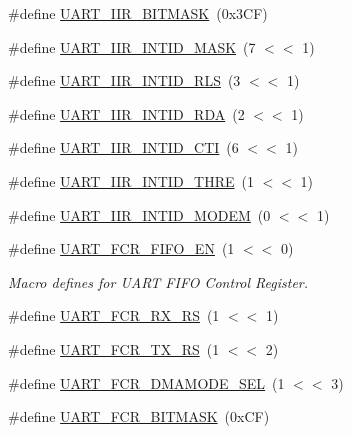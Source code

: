\begin{DoxyCompactItemize}
\item 
\#define \hyperlink{group___u_a_r_t__18_x_x__43_x_x_gad443b74131fa7b7aecf0f1c581172faa}{U\+A\+R\+T\+\_\+\+I\+I\+R\+\_\+\+B\+I\+T\+M\+A\+SK}~(0x3\+C\+F)
\item 
\#define \hyperlink{group___u_a_r_t__18_x_x__43_x_x_ga6f78952aec5835ac753718323b681910}{U\+A\+R\+T\+\_\+\+I\+I\+R\+\_\+\+I\+N\+T\+I\+D\+\_\+\+M\+A\+SK}~(7 $<$$<$ 1)
\item 
\#define \hyperlink{group___u_a_r_t__18_x_x__43_x_x_ga4441660d2a99f6b17a79eafbfb0424dd}{U\+A\+R\+T\+\_\+\+I\+I\+R\+\_\+\+I\+N\+T\+I\+D\+\_\+\+R\+LS}~(3 $<$$<$ 1)
\item 
\#define \hyperlink{group___u_a_r_t__18_x_x__43_x_x_gac646d8f797f3e71e01f4361997fc581b}{U\+A\+R\+T\+\_\+\+I\+I\+R\+\_\+\+I\+N\+T\+I\+D\+\_\+\+R\+DA}~(2 $<$$<$ 1)
\item 
\#define \hyperlink{group___u_a_r_t__18_x_x__43_x_x_ga965ba229214955385f11277549b7ecce}{U\+A\+R\+T\+\_\+\+I\+I\+R\+\_\+\+I\+N\+T\+I\+D\+\_\+\+C\+TI}~(6 $<$$<$ 1)
\item 
\#define \hyperlink{group___u_a_r_t__18_x_x__43_x_x_gafb93160677afbc9c90f7a0baa917a435}{U\+A\+R\+T\+\_\+\+I\+I\+R\+\_\+\+I\+N\+T\+I\+D\+\_\+\+T\+H\+RE}~(1 $<$$<$ 1)
\item 
\#define \hyperlink{group___u_a_r_t__18_x_x__43_x_x_gaf02dabd5f0b60345c70379ab8df3e899}{U\+A\+R\+T\+\_\+\+I\+I\+R\+\_\+\+I\+N\+T\+I\+D\+\_\+\+M\+O\+D\+EM}~(0 $<$$<$ 1)
\item 
\#define \hyperlink{group___u_a_r_t__18_x_x__43_x_x_gadec12ecfc7ae1198cee68f2cad982bcb}{U\+A\+R\+T\+\_\+\+F\+C\+R\+\_\+\+F\+I\+F\+O\+\_\+\+EN}~(1 $<$$<$ 0)
\begin{DoxyCompactList}\small\item\em Macro defines for U\+A\+RT F\+I\+FO Control Register. \end{DoxyCompactList}\item 
\#define \hyperlink{group___u_a_r_t__18_x_x__43_x_x_ga246b37ccd6137c0bb51eb32760cb228e}{U\+A\+R\+T\+\_\+\+F\+C\+R\+\_\+\+R\+X\+\_\+\+RS}~(1 $<$$<$ 1)
\item 
\#define \hyperlink{group___u_a_r_t__18_x_x__43_x_x_ga1c1a83fcacf333309330eea460d8a6a6}{U\+A\+R\+T\+\_\+\+F\+C\+R\+\_\+\+T\+X\+\_\+\+RS}~(1 $<$$<$ 2)
\item 
\#define \hyperlink{group___u_a_r_t__18_x_x__43_x_x_ga996e144f7d08cb36aa729f28d74b5801}{U\+A\+R\+T\+\_\+\+F\+C\+R\+\_\+\+D\+M\+A\+M\+O\+D\+E\+\_\+\+S\+EL}~(1 $<$$<$ 3)
\item 
\#define \hyperlink{group___u_a_r_t__18_x_x__43_x_x_ga2dd6b12c7c237b0a52c6a82698f85b04}{U\+A\+R\+T\+\_\+\+F\+C\+R\+\_\+\+B\+I\+T\+M\+A\+SK}~(0x\+C\+F)

\end{DoxyCompactItemize}
